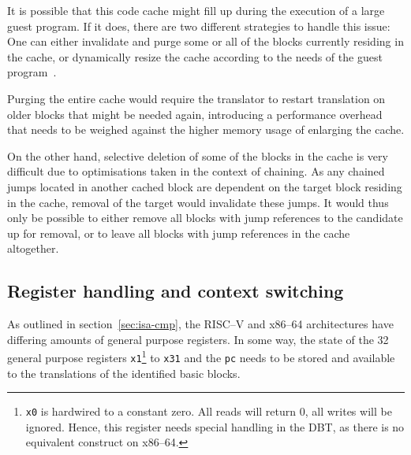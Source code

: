 It is possible that this code cache might fill up during the execution of a large guest program.
If it does, there are two different strategies to handle this issue:
One can either invalidate and purge some or all of the blocks currently residing in the cache, or dynamically resize the cache according to the needs of the guest program~\cite[S. 3]{bintrans}.

Purging the entire cache would require the translator to restart translation on older blocks that might be needed again, introducing a performance overhead that needs to be weighed against the higher memory usage of enlarging the cache.

On the other hand, selective deletion of some of the blocks in the cache is very difficult due to optimisations taken in the context of chaining.
As any chained jumps located in another cached block are dependent on the target block residing in the cache, removal of the target would invalidate these jumps.
It would thus only be possible to either remove all blocks with jump references to the candidate up for removal, or to leave all blocks with jump references in the cache altogether.

\subsection{Register handling and context switching}
\label{sec:context-switch-reg-handle}
As outlined in section~\ref{sec:isa-cmp}, the RISC--V and x86--64 architectures have differing amounts of general purpose registers.
In some way, the state of the 32 general purpose registers \texttt{x1}\footnote{\texttt{x0} is hardwired to a constant zero. All reads will return 0, all writes will be ignored. Hence, this register needs special handling in the DBT, as there is no equivalent construct on x86--64.} to \texttt{x31} and the \texttt{pc} needs to be stored and available to the translations of the identified basic blocks.

